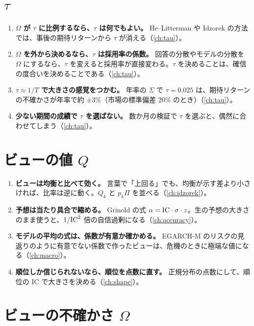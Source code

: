 \section{$\tau$}

\begin{enumerate}[label=\textbf{\arabic*.},leftmargin=2.2em,resume]
\item \textbf{$\Omega$ が $\tau$ に比例するなら、$\tau$ は何でもよい。} He--Litterman や Idzorek の方法では、事後の期待リターンから $\tau$ が消える（\ref{ch:tau}）。
\item \textbf{$\Omega$ を外から決めるなら、$\tau$ は採用率の係数。} 回答の分散やモデルの分散を $\Omega$ にするなら、$\tau$ を変えると採用率が直接変わる。$\tau$ を決めることは、確信の度合いを決めることである（\ref{ch:tau}）。
\item \textbf{$\tau\approx1/T$ で大きさの感覚をつかむ。} 年率の $\Sigma$ で $\tau=0.025$ は、期待リターンの不確かさが年率で約 ±3\%（市場の標準偏差 20\% のとき）（\ref{ch:tau}）。
\item \textbf{少ない期間の成績で $\tau$ を選ばない。} 数か月の検証で $\tau$ を選ぶと、偶然に合わせてしまう（\ref{ch:tau}）。
\end{enumerate}

\section{ビューの値 $Q$}

\begin{enumerate}[label=\textbf{\arabic*.},leftmargin=2.2em,resume]
\item \textbf{ビューは均衡と比べて効く。} 言葉で「上回る」でも、均衡が示す差より小さければ、比率は逆に動く。$Q_k$ と $p_k\Pi$ を並べる（\ref{ch:idzorek}）。
\item \textbf{予想は当たり具合で縮める。} Grinold の式 $\alpha=\mathrm{IC}\cdot\sigma\cdot z$。生の予想の大きさのまま使うと、$1/\mathrm{IC}^2$ 倍の自信過剰になる（\ref{ch:accuracy}）。
\item \textbf{モデルの平均の式は、係数が有意か確かめる。} EGARCH-M のリスクの見返りのように有意でない係数で作ったビューは、危機のときに極端な値になる（\ref{ch:macro}）。
\item \textbf{順位しか信じられないなら、順位を点数に直す。} 正規分布の点数にして、順位の IC で大きさを決める（\ref{ch:shape}）。
\end{enumerate}

\section{ビューの不確かさ $\Omega$}

